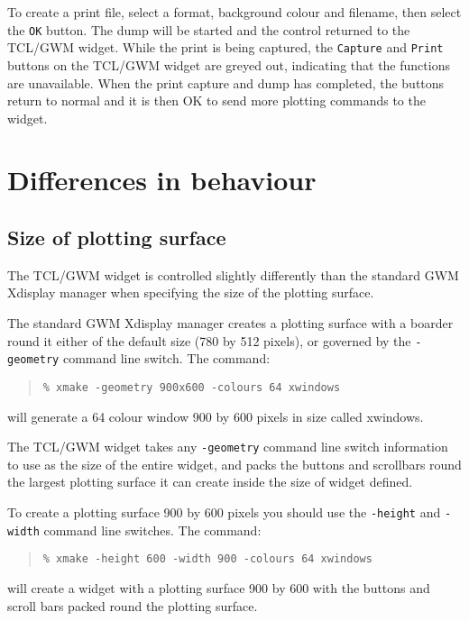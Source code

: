 To create a print file, select a format, background colour and filename,
then select the {\tt{OK}} button.  The dump will be started and the control
returned to the TCL/GWM widget.  While the print is being captured, the
{\tt{Capture}} and {\tt{Print}} buttons on the TCL/GWM widget are greyed
out, indicating that the functions are unavailable.  When the print capture
and dump has completed, the buttons return to normal and it is then OK to
send more plotting commands to the widget.

\section{\label{differences}Differences in behaviour}

\subsection{\label{size_of_plotting_surface}Size of plotting surface}

The TCL/GWM widget is controlled slightly differently than the standard GWM 
Xdisplay manager when specifying the size of the plotting surface.

The standard GWM Xdisplay manager creates a plotting surface with a boarder
round it either of the default size (780 by 512 pixels), or governed by the 
{\tt{-geometry}} command line switch.  The command:

\begin{quote}
{\tt \% xmake -geometry 900x600 -colours 64 xwindows}
\end{quote}

will generate a 64 colour window 900 by 600 pixels in size called xwindows.

The TCL/GWM widget takes any {\tt{-geometry}} command line switch information 
to use as the size of the entire widget, and packs the buttons and scrollbars
round the largest plotting surface it can create inside the size of widget
defined.

To create a plotting surface 900 by 600 pixels you should use the
{\tt{-height}} and {\tt{-width}} command line switches.  The command:

\begin{quote}
{\tt \% xmake -height 600 -width 900 -colours 64 xwindows}
\end{quote}                                                            

will create a widget with a plotting surface 900 by 600 with the buttons
and scroll bars packed round the plotting surface.


